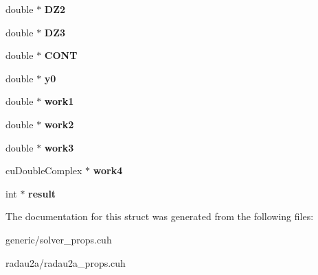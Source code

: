 \begin{DoxyCompactItemize}
\item 
double $\ast$ {\bfseries D\+Z2}\hypertarget{structsolver__memory_aa5d1338448423480b4074926794433f9}{}\label{structsolver__memory_aa5d1338448423480b4074926794433f9}

\item 
double $\ast$ {\bfseries D\+Z3}\hypertarget{structsolver__memory_ab2a8855e36cb6a07cf023f0202fb52ef}{}\label{structsolver__memory_ab2a8855e36cb6a07cf023f0202fb52ef}

\item 
double $\ast$ {\bfseries C\+O\+NT}\hypertarget{structsolver__memory_a6e5e4e493505010035b690ea30d49242}{}\label{structsolver__memory_a6e5e4e493505010035b690ea30d49242}

\item 
double $\ast$ {\bfseries y0}\hypertarget{structsolver__memory_a8837c70538f1410e79b4a125549cfa2e}{}\label{structsolver__memory_a8837c70538f1410e79b4a125549cfa2e}

\item 
double $\ast$ {\bfseries work1}\hypertarget{structsolver__memory_a57f447c07f363c462e91716393df0b3c}{}\label{structsolver__memory_a57f447c07f363c462e91716393df0b3c}

\item 
double $\ast$ {\bfseries work2}\hypertarget{structsolver__memory_a8f8a7539530bd566a5c241c5a9a5930a}{}\label{structsolver__memory_a8f8a7539530bd566a5c241c5a9a5930a}

\item 
double $\ast$ {\bfseries work3}\hypertarget{structsolver__memory_a5f1625152446318c7489bb9a0eaadf02}{}\label{structsolver__memory_a5f1625152446318c7489bb9a0eaadf02}

\item 
cu\+Double\+Complex $\ast$ {\bfseries work4}\hypertarget{structsolver__memory_a2d1926f048b79b2a7cffc29dc5db187d}{}\label{structsolver__memory_a2d1926f048b79b2a7cffc29dc5db187d}

\item 
int $\ast$ {\bfseries result}\hypertarget{structsolver__memory_a874434e5cded842c4961f3f05bbf6759}{}\label{structsolver__memory_a874434e5cded842c4961f3f05bbf6759}

\end{DoxyCompactItemize}


The documentation for this struct was generated from the following files\+:\begin{DoxyCompactItemize}
\item 
generic/solver\+\_\+props.\+cuh\item 
radau2a/radau2a\+\_\+props.\+cuh\end{DoxyCompactItemize}
